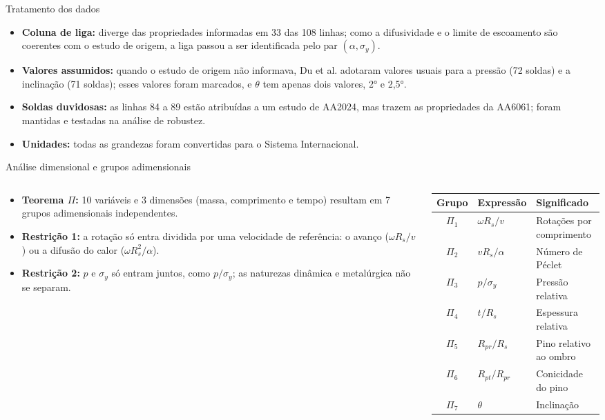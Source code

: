 \documentclass[aspectratio=169,11pt]{beamer}
\newenvironment{bullets}{\begin{itemize}\setlength{\itemsep}{5pt}}{\end{itemize}}
\begin{document}
\begin{frame}{Tratamento dos dados}
\vspace{0.2cm}
\begin{bullets}
  \item \textbf{Coluna de liga:} diverge das propriedades informadas em 33 das 108 linhas; como a difusividade e o limite de escoamento são coerentes com o estudo de origem, a liga passou a ser identificada pelo par $(\alpha, \sigma_y)$.
  \item \textbf{Valores assumidos:} quando o estudo de origem não informava, Du et al. adotaram valores usuais para a pressão (72 soldas) e a inclinação (71 soldas); esses valores foram marcados, e $\theta$ tem apenas dois valores, 2° e 2,5°.
  \item \textbf{Soldas duvidosas:} as linhas 84 a 89 estão atribuídas a um estudo de AA2024, mas trazem as propriedades da AA6061; foram mantidas e testadas na análise de robustez.
  \item \textbf{Unidades:} todas as grandezas foram convertidas para o Sistema Internacional.
\end{bullets}
\end{frame}

\begin{frame}{Análise dimensional e grupos adimensionais}
\begin{columns}[T,onlytextwidth]
\begin{column}{0.44\textwidth}
\begin{bullets}
  \item \textbf{Teorema $\Pi$:} 10 variáveis e 3 dimensões (massa, comprimento e tempo) resultam em 7 grupos adimensionais independentes.
  \item \textbf{Restrição 1:} a rotação só entra dividida por uma velocidade de referência: o avanço ($\omega R_s/v$) ou a difusão do calor ($\omega R_{s}^{2}/\alpha$).
  \item \textbf{Restrição 2:} $p$ e $\sigma_y$ só entram juntos, como $p/\sigma_y$; as naturezas dinâmica e metalúrgica não se separam.
\end{bullets}
\end{column}
\begin{column}{0.53\textwidth}
\centering\scriptsize\setlength{\tabcolsep}{4pt}
\begin{tabular}{cll}
\toprule
\textbf{Grupo} & \textbf{Expressão} & \textbf{Significado} \\ \midrule
$\Pi_1$ & $\omega R_s/v$ & Rotações por comprimento \\
$\Pi_2$ & $vR_s/\alpha$ & Número de Péclet \\
$\Pi_3$ & $p/\sigma_y$ & Pressão relativa \\
$\Pi_4$ & $t/R_s$ & Espessura relativa \\
$\Pi_5$ & $R_{pr}/R_s$ & Pino relativo ao ombro \\
$\Pi_6$ & $R_{pt}/R_{pr}$ & Conicidade do pino \\
$\Pi_7$ & $\theta$ & Inclinação \\ \bottomrule
\end{tabular}
\end{column}
\end{columns}
\end{frame}
\end{document}
